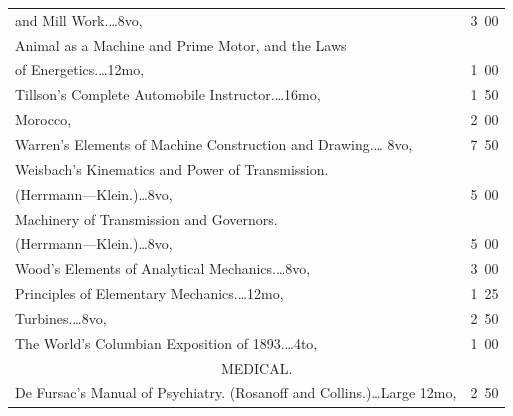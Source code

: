 \documentclass[a4paper,12pt]{book}[2004/02/16]
\theoremstyle{ilemma}
\theoremstyle{itheorem}
\theoremstyle{iother}
\theoremstyle{icorollary}
\theoremstyle{numcorollary}
\theoremstyle{idefinition}
\begin{document}
\begin{longtable}{@{}l@{ }r@{}}
\nopagebreak

\indent\indent and Mill Work.\dotfill\ldots 8vo, & 3\ 00\\

\indent Animal as a Machine and Prime Motor, and the Laws\\

\nopagebreak

\indent\indent of Energetics.\dotfill\ldots 12mo, & 1\ 00\\

Tillson's Complete Automobile Instructor.\dotfill\ldots 16mo, & 1\ 50\\

\hfill Morocco, & 2\ 00\\

Warren's Elements of Machine Construction and Drawing.\dotfill\ldots
8vo, & 7\ 50\\

Weisbach's Kinematics and Power of Transmission.\\

\nopagebreak

\indent\indent (Herrmann---Klein.)\dotfill\ldots 8vo, & 5\ 00\\

\indent Machinery of Transmission and Governors.\\

\nopagebreak

\indent\indent (Herrmann---Klein.)\dotfill\ldots 8vo, & 5\ 00\\

Wood's Elements of Analytical Mechanics.\dotfill\ldots 8vo, & 3\ 00\\

\indent Principles of Elementary Mechanics.\dotfill\ldots 12mo, & 1\ 25\\

\indent Turbines.\dotfill\ldots 8vo, & 2\ 50\\

The World's Columbian Exposition of 1893.\dotfill\ldots 4to, & 1\ 00\\[3em]



\multicolumn{2}{c}{\large MEDICAL.}\\[1em]

\nopagebreak

De Fursac's Manual of Psychiatry. (Rosanoff and
Collins.)\dotfill\ldots Large 12mo, & 2\ 50\\


\end{longtable}
\end{document}
